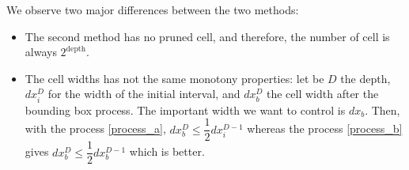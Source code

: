 \documentclass[a4paper,10pt]{article}
\begin{document}
\begin{table}[h!]
\centering
\caption{Meshes generated by process \ref{process_b} with an 
interface at $0.7$ and a $120\%$-bounding box.}
\label{tab:my-table}
\end{table}

We observe two major differences between the two methods:
\begin{itemize}
 \item The second method has no pruned cell, and therefore, the number of cell 
is always $2^{\text{depth}}$.
\item The cell widths has not the same monotony properties: let be $D$ the 
depth, $dx_i^D$ for the width of the initial interval, and $dx_b^D$ the cell 
width after the bounding box process. The important width we want to control is 
$dx_b$. Then, with the process \ref{process_a}, $dx_b^D \leq \dfrac{1}{2} 
dx_i^{D-1}$ whereas the process \ref{process_b} gives $dx_b^D \leq \dfrac{1}{2} 
dx_b^{D-1}$ which is better.
\end{itemize}
\end{document}
